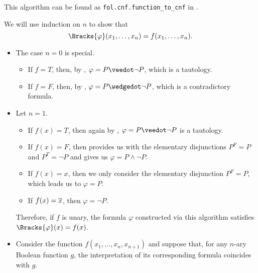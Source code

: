 \begin{comments}
  \item This algorithm can be found as \texttt{fol.cnf.function\_to\_cnf} in \cite{code}.
\end{comments}
\begin{defproof}
  We will use induction on \( n \) to show that
  \begin{equation*}
    \Bracks{\varphi}(x_1, \ldots, x_n) = f(x_1, \ldots, x_n).
  \end{equation*}

  \begin{itemize}
    \item The case \( n = 0 \) is special.
    \begin{itemize}
      \item If \( f = T \), then, by , \( \varphi = P \synvee \neg P \), which is a tautology.
      \item If \( f = F \), then, by , \( \varphi = P \synwedge \neg P \), which is a contradictory formula.
    \end{itemize}

    \item Let \( n = 1 \).
    \begin{itemize}
      \item If \( f(x) = T \), then again by , \( \varphi = P \synvee \neg P \) is a tautology.
      \item If \( f(x) = F \), then  provides us with the elementary disjunctions \( P^F = P \) and \( P^T = \neg P \) and  gives us \( \varphi = P \wedge \neg P \).
      \item If \( f(x) = x \), then we only consider the elementary disjunction \( P^F = P \), which leads us to \( \varphi = P \).
      \item If \( f(x) = \oline{x} \), then \( \varphi = \neg P \).
    \end{itemize}

    Therefore, if \( f \) is unary, the formula \( \varphi \) constructed via this algorithm satisfies \( \Bracks{\varphi}(x) = f(x) \).

    \item Consider the function \( f(x_1, \ldots, x_n, x_{n+1}) \) and suppose that, for any \( n \)-ary Boolean function \( g \), the interpretation of its corresponding formula coincides with \( g \).


\end{itemize}
\end{defproof}
